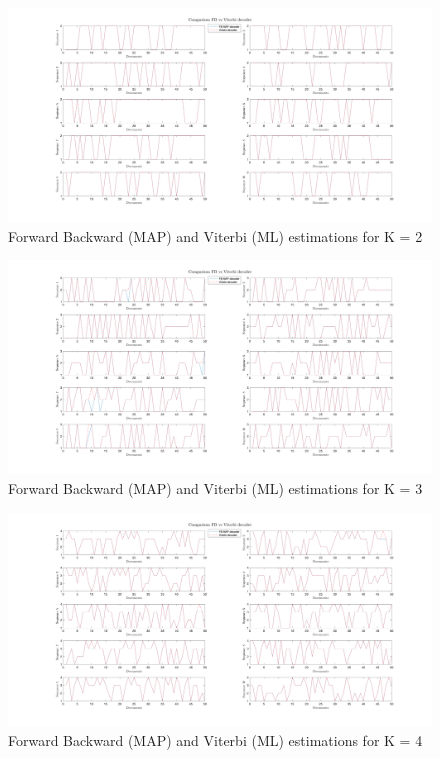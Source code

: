 \documentclass[12pt]{article}
\begin{document}
\begin{figure}[h]
	\centering
	\includegraphics[width=\textwidth]{images/comparison_FB_Viterbi_K_2.png}
	\caption{Forward Backward (MAP) and Viterbi (ML) estimations for K = 2}
	\label{fig:viterbi_2}
\end{figure}

\begin{figure}[h]
	\centering
	\includegraphics[width=\textwidth]{images/comparison_FB_Viterbi_K_3.png}
	\caption{Forward Backward (MAP) and Viterbi (ML) estimations for K = 3}
	\label{fig:viterbi_3}
\end{figure}

\begin{figure}[h]
	\centering
	\includegraphics[width=\textwidth]{images/comparison_FB_Viterbi_K_4.png}
	\caption{Forward Backward (MAP) and Viterbi (ML) estimations for K = 4}
	\label{fig:viterbi_4}
\end{figure}
\end{document}
